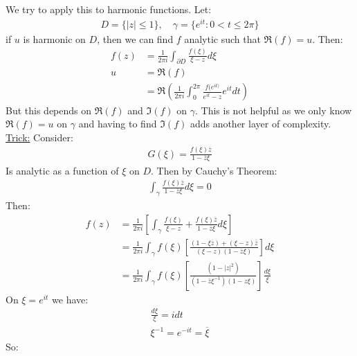 \begin{proposition}
    We try to apply this to harmonic functions. Let:
    \begin{align}
        D = \{|z|\leq 1\}, \quad \gamma = \{e^{it} : 0 < t \leq 2\pi\}
    \end{align}
    if $u$ is harmonic on $D$, then we can find $f$ analytic such that $\Re (f) = u$. Then:
    \begin{align}
        f(z) & = \frac{1}{2\pi i}\int_{\partial D} \frac{f(\xi)}{\xi - z} d\xi                             \\
        u    & = \Re (f)                                                                                   \\
             & = \Re \left( \frac{1}{2\pi i}\int_{0}^{2\pi} \frac{f(e^{it)}}{e^{it} - z} e^{it} dt \right)
    \end{align}
    But this depends on $\Re(f)$ and $\Im(f)$ on $\gamma$. This is not helpful as we only know $\Re(f) = u$ on $\gamma$ and having to find $\Im(f)$ adds another layer of complexity.\\
    \underline{Trick:} Consider:
    \begin{align}
        G(\xi) = \frac{f(\xi)\overline{z}}{1 - \overline{z}\xi}
    \end{align}
    Is analytic as a function of $\xi$ on $D$. Then by Cauchy's Theorem:
    \begin{align}
        \int_\gamma \frac{f(\xi)\overline{z}}{1 - \overline{z}\xi} d\xi = 0
    \end{align}
    Then:
    \begin{align}
        f(z) & = \frac{1}{2\pi i}\left[ \int_\gamma \frac{f(\xi)}{\xi - z} + \frac{f(\xi)\overline{z}}{1 - \overline{z}\xi}d\xi\right]                      \\
             & = \frac{1}{2\pi i}\int_\gamma f(\xi)\left[ \frac{(1 - \xi \overline{z}) + (\xi - z)\overline{z}}{(\xi - z)(1 - \overline{z}\xi)} \right]d\xi \\
             & = \frac{1}{2\pi i}\int_\gamma f(\xi)\left[\frac{(1 - |z|^2)}{(1 - \overline{z}\xi^{-1})(1 - z\xi)}\right]\frac{d\xi}{\xi}
    \end{align}
    On $\xi = e^{it}$ we have:
    \begin{align}
        \frac{d\xi}{\xi} = i dt \\
        \xi^{-1} = e^{-it} = \overline{\xi}
    \end{align}
    So:

\end{proposition}
